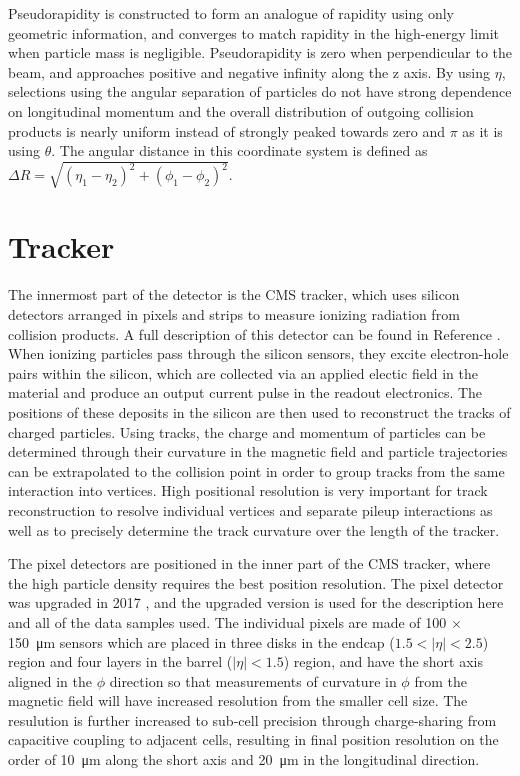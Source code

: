 Pseudorapidity is constructed to form an analogue of rapidity using only geometric information, and converges to match rapidity in the high-energy limit when particle mass is negligible.
Pseudorapidity is zero when perpendicular to the beam, and approaches positive and negative infinity along the z axis. 
By using $\eta$, selections using the angular separation of particles do not have strong dependence on longitudinal momentum and the overall distribution of outgoing collision products is nearly uniform instead of strongly peaked towards zero and $\pi$ as it is using $\theta$.  
The angular distance in this coordinate system is defined as $\Delta R = \sqrt{(\eta_1-\eta_2)^2+(\phi_1-\phi_2)^2}$.

\section{Tracker}
The innermost part of the detector is the CMS tracker, which uses silicon detectors arranged in pixels and strips to measure ionizing radiation from collision products. 
A full description of this detector can be found in Reference \cite{trackerTDR}.
When ionizing particles pass through the silicon sensors, they excite electron-hole pairs within the silicon, which are collected via an applied electic field in the material and produce an output current pulse in the readout electronics.
The positions of these deposits in the silicon are then used to reconstruct the tracks of charged particles.
Using tracks, the charge and momentum of particles can be determined through their curvature in the magnetic field and particle trajectories can be extrapolated to the collision point in order to group tracks from the same interaction into vertices. 
High positional resolution is very important for track reconstruction to resolve individual vertices and separate pileup interactions as well as to precisely determine the track curvature over the length of the tracker. 

The pixel detectors are positioned in the inner part of the CMS tracker, where the high particle density requires the best position resolution. 
The pixel detector was upgraded in 2017 \cite{pixelUpgrade}, and the upgraded version is used for the description here and all of the data samples used. 
The individual pixels are made of 100 $\times$ \SI{150}{\micro\meter} sensors which are placed in three disks in the endcap ($1.5<\lvert\eta\rvert<2.5$) region and four layers in the barrel ($\lvert\eta\rvert<1.5$) region, and have the short axis aligned in the $\phi$ direction so that measurements of curvature in $\phi$ from the magnetic field will have increased resolution from the smaller cell size. 
The resulution is further increased to sub-cell precision through charge-sharing from capacitive coupling to adjacent cells, resulting in final position resolution on the order of \SI{10}{\micro\meter} along the short axis and \SI{20}{\micro\meter} in the longitudinal direction.


